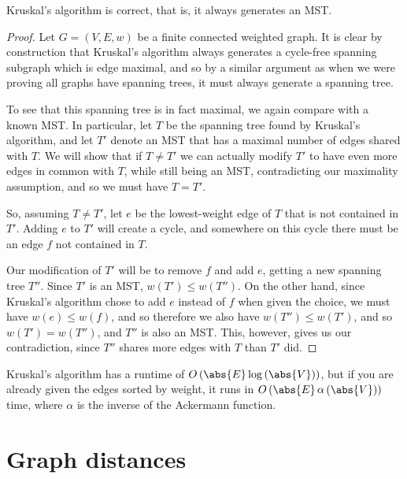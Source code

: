 \documentclass[nobib]{tufte-handout}
\begin{document}
\begin{theorem}
  Kruskal's algorithm is correct, that is, it always generates an MST.

  \begin{proof}
    Let $G = (V,E,w)$ be a finite connected weighted graph. It is clear by construction that Kruskal's algorithm always generates a cycle-free spanning subgraph which is edge maximal, and so by a similar argument as when we were proving all graphs have spanning trees, it must always generate a spanning tree.

    To see that this spanning tree is in fact maximal, we again compare with a known MST. In particular, let $T$ be the spanning tree found by Kruskal's algorithm, and let $T'$ denote an MST that has a maximal number of edges shared with $T$. We will show that if $T \neq T'$ we can actually modify $T'$ to have even more edges in common with $T$, while still being an MST, contradicting our maximality assumption, and so we must have $T = T'$.

    So, assuming $T \neq T'$, let $e$ be the lowest-weight edge of $T$ that is not contained in $T'$. Adding $e$ to $T'$ will create a cycle, and somewhere on this cycle there must be an edge $f$ not contained in $T$.

    Our modification of $T'$ will be to remove $f$ and add $e$, getting a new spanning tree $T''$. Since $T'$ is an MST, $w(T') \leq w(T'')$. On the other hand, since Kruskal's algorithm chose to add $e$ instead of $f$ when given the choice, we must have $w(e) \leq w(f)$, and so therefore we also have $w(T'') \leq w(T')$, and so $w(T') = w(T'')$, and $T''$ is also an MST. This, however, gives us our contradiction, since $T''$ shares more edges with $T$ than $T'$ did.
  \end{proof}
\end{theorem}

\begin{remark}
  Kruskal's algorithm has a runtime of $O\left(\abs{E}\log\left(\abs{V}\right)\right)$, but if you are already given the edges sorted by weight, it runs in $O\left(\abs{E}\mathop{\alpha}\left(\abs{V}\right)\right)$ time, where $\alpha$ is the inverse of the Ackermann function.
\end{remark}

\section{Graph distances}
\end{document}
